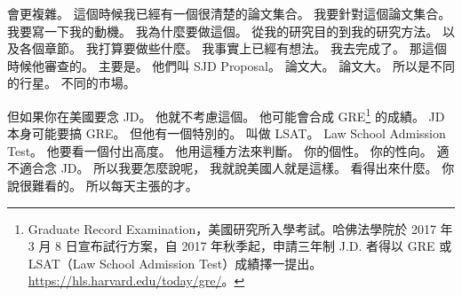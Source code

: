\hypertarget{c01:cue:2911}{}會更複雜。
\hypertarget{c01:cue:2912}{}這個時候我已經有一個很清楚的論文集合。
\hypertarget{c01:cue:2913}{}我要針對這個論文集合。
\hypertarget{c01:cue:2914}{}我要寫一下我的動機。
\hypertarget{c01:cue:2915}{}我為什麼要做這個。
\hypertarget{c01:cue:2916}{}從我的研究目的到我的研究方法。
\hypertarget{c01:cue:2917}{}以及各個章節。
\hypertarget{c01:cue:2918}{}我打算要做些什麼。
\hypertarget{c01:cue:2919}{}我事實上已經有想法。
\hypertarget{c01:cue:2920}{}我去完成了。
\hypertarget{c01:cue:2921}{}那這個時候他審查的。
\hypertarget{c01:cue:2922}{}主要是。
\hypertarget{c01:cue:2923}{}他們叫 SJD Proposal。
\hypertarget{c01:cue:2924}{}論文大。
\hypertarget{c01:cue:2925}{}論文大。
\hypertarget{c01:cue:2926}{}所以是不同的行星。
\hypertarget{c01:cue:2927}{}不同的市場。

\hypertarget{c01:cue:2928}{}但如果你在美國要念 JD。
\hypertarget{c01:cue:2929}{}他就不考慮這個。
\hypertarget{c01:cue:2930}{}他可能會合成 GRE\footnote{Graduate Record Examination，美國研究所入學考試。哈佛法學院於 2017 年 3 月 8 日宣布試行方案，自 2017 年秋季起，申請三年制 J.D. 者得以 GRE 或 LSAT（Law School Admission Test）成績擇一提出。\url{https://hls.harvard.edu/today/gre/}。} 的成績。
\hypertarget{c01:cue:2931}{}JD 本身可能要搞 GRE。
\hypertarget{c01:cue:2932}{}但他有一個特別的。
\hypertarget{c01:cue:2933}{}叫做 LSAT。
\hypertarget{c01:cue:2934}{}Law School Admission Test。
\hypertarget{c01:cue:2935}{}他要看一個付出高度。
\hypertarget{c01:cue:2936}{}他用這種方法來判斷。
\hypertarget{c01:cue:2937}{}你的個性。
\hypertarget{c01:cue:2938}{}你的性向。
\hypertarget{c01:cue:2939}{}適不適合念 JD。
\hypertarget{c01:cue:2940}{}所以我要怎麼說呢，
\hypertarget{c01:cue:2941}{}我就說美國人就是這樣。
\hypertarget{c01:cue:2942}{}看得出來什麼。
\hypertarget{c01:cue:2943}{}你說很難看的。
\hypertarget{c01:cue:2944}{}所以每天主張的才。

